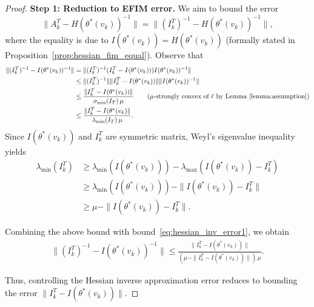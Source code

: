 \documentclass[11 pt]{article}
\begin{document}
\begin{proof}
\textbf{Step 1: Reduction to EFIM error.} We aim to bound the error 
\[
\|A_k^T - H(\theta^*(v_k))^{-1}\|=\|(I_k^T)^{-1} - H(\theta^*(v_k))^{-1}\|,
\]
where the equality is due to $I(\theta^*(v_k)) = H(\theta^*(v_k))$ (formally stated in Proposition~\ref{prop:hessian_fim_equal}).
Observe that
\begin{align}
\|(I_k^T)^{-1} - I(\theta^*(v_k))^{-1}\| &= \|(I_k^T)^{-1}(I_k^T-I(\theta^*(v_k)))I(\theta^*(v_k))^{-1}\| \nonumber\\
&\leq \|(I_k^T)^{-1}\| \|I_k^T-I(\theta^*(v_k))\| \|I(\theta^*(v_k))^{-1}\| \nonumber\\
&\leq \frac{\|I_k^T- I(\theta^*(v_k))\|}{\sigma_{\min}(I_T)\,\mu} \tag{$\mu$-strongly convex of $\ell$ by Lemma~\ref{lemma:assumption}} \\
&\leq \frac{\|I_k^T - I(\theta^*(v_k)\|}{\lambda_{\min}(I_T)\,\mu}.\label{eq:hessian_inv_error1}
\end{align}
Since $I(\theta^*(v_k))$ and $I_k^T$ are symmetric matrix, Weyl's eigenvalue inequality yields
\begin{align}\label{eq:lambda_IT}
\lambda_{\text{min}}(I_k^T)&\geq 
    \lambda_{\text{min}}(I(\theta^*(v_k))) - \lambda_{\text{max}}(I(\theta^*(v_k))-I_k^T) \nonumber \\
    & \geq \lambda_{\text{min}}(I(\theta^*(v_k)))-\|I(\theta^*(v_k))-I_k^T\| \nonumber\\
    &\geq \mu-\|I(\theta^*(v_k))-I_k^T\|. \tag{ $\mu$-strongly convexity of $\ell$} 
\end{align}

Combining the above bound with bound~\eqref{eq:hessian_inv_error1}, we obtain
\begin{align*}
    \|(I_k^T)^{-1} - I(\theta^*(v_k))^{-1}\| \leq \frac{\|I_k^T - I(\theta^*(v_k))\|}{(\mu-\|I_k^T - I(\theta^*(v_k))\|)\,\mu}.
\end{align*}

Thus, controlling the Hessian inverse approximation error reduces to bounding the error $\| I_k^T-I(\theta^*(v_k))\|$. 



\end{proof}
\end{document}
